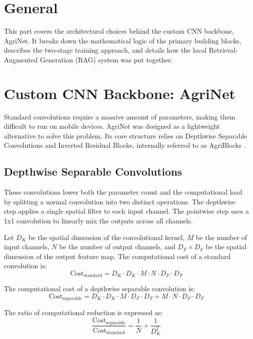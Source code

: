 \documentclass[12pt, a4paper]{report}
\begin{document}
\section{General}
This part covers the architectural choices behind the custom CNN backbone, AgriNet. It breaks down the mathematical logic of the primary building blocks, describes the two-stage training approach, and details how the local Retrieval-Augmented Generation (RAG) system was put together.

\section{Custom CNN Backbone: AgriNet}
Standard convolutions require a massive amount of parameters, making them difficult to run on mobile devices. AgriNet was designed as a lightweight alternative to solve this problem. Its core structure relies on Depthwise Separable Convolutions and Inverted Residual Blocks, internally referred to as AgriBlocks \cite{mobilenetv2}.

\subsection{Depthwise Separable Convolutions}
These convolutions lower both the parameter count and the computational load by splitting a normal convolution into two distinct operations. The depthwise step applies a single spatial filter to each input channel. The pointwise step uses a 1x1 convolution to linearly mix the outputs across all channels.

Let $D_K$ be the spatial dimension of the convolutional kernel, $M$ be the number of input channels, $N$ be the number of output channels, and $D_F \times D_F$ be the spatial dimension of the output feature map. The computational cost of a standard convolution is:
\begin{equation}
\text{Cost}_{\text{standard}} = D_K \cdot D_K \cdot M \cdot N \cdot D_F \cdot D_F
\end{equation}

The computational cost of a depthwise separable convolution is:
\begin{equation}
\text{Cost}_{\text{separable}} = D_K \cdot D_K \cdot M \cdot D_F \cdot D_F + M \cdot N \cdot D_F \cdot D_F
\end{equation}

The ratio of computational reduction is expressed as:
\begin{equation}
\frac{\text{Cost}_{\text{separable}}}{\text{Cost}_{\text{standard}}} = \frac{1}{N} + \frac{1}{D_K^2}
\end{equation}
\end{document}
